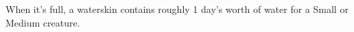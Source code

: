 

When it's full, a waterskin contains roughly 1 day's worth of water for a Small or Medium creature.

\vfill

\hfill{}
